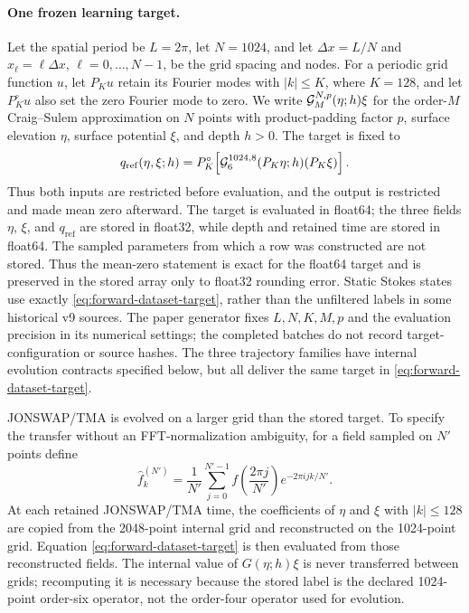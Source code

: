 \paragraph{One frozen learning target.}
Let the spatial period be $L=2\pi$, let $N=1024$, and let
$\Delta x=L/N$ and $x_\ell=\ell\Delta x$, $\ell=0,\ldots,N-1$, be the grid
spacing and nodes.  For a periodic grid function $u$, let $P_K u$ retain its
Fourier modes with $|k|\leq K$, where $K=128$, and let $P_K^\circ u$ also set
the zero Fourier mode to zero.  We
write $\mathcal{G}_M^{N,p}(\eta;h)\xi$ for the order-$M$ Craig--Sulem approximation on
$N$ points with product-padding factor $p$, surface elevation $\eta$, surface
potential $\xi$, and depth $h>0$.  The target is fixed to
\begin{equation}
  q_{\mathrm{ref}}(\eta,\xi;h)
  =
  P_K^\circ\!\left[
    \mathcal{G}_{6}^{1024,8}(P_K\eta;h)(P_K\xi)
  \right].
  \label{eq:forward-dataset-target}
\end{equation}
Thus both inputs are restricted before evaluation, and the output is
restricted and made mean zero afterward.  The target is evaluated in float64;
the three fields $\eta$, $\xi$, and $q_{\mathrm{ref}}$ are stored in float32,
while depth and retained time are stored in float64.  The sampled parameters
from which a row was constructed are not stored.
Thus the mean-zero statement is exact for the float64 target and is preserved
in the stored array only to float32 rounding error.
Static Stokes states use exactly \cref{eq:forward-dataset-target}, rather than
the unfiltered labels in some historical v9 sources.  The paper generator fixes
$L,N,K,M,p$ and the evaluation precision in its numerical settings; the completed
batches do not record target-configuration or source hashes.
The three trajectory families have internal evolution contracts specified
below, but all deliver the same target in
\cref{eq:forward-dataset-target}.

JONSWAP/TMA is evolved on a larger grid than the stored target.  To specify
the transfer without an FFT-normalization ambiguity, for a field sampled on
\(N'\) points define
\begin{equation}
  \widehat f_k^{(N')}
  =\frac1{N'}\sum_{j=0}^{N'-1}
    f\!\left(\frac{2\pi j}{N'}\right)e^{-2\pi i jk/N'}.
  \label{eq:paper-normalized-fourier-coefficient}
\end{equation}
At each retained JONSWAP/TMA time, the coefficients of \(\eta\) and \(\xi\)
with \(|k|\le128\) are copied from the 2048-point internal grid and
reconstructed on the 1024-point grid.  Equation
\eqref{eq:forward-dataset-target} is then evaluated from those reconstructed
fields.  The internal value of \(G(\eta;h)\xi\) is never transferred between
grids; recomputing it is necessary because the stored label is the declared
1024-point order-six operator, not the order-four operator used for evolution.

